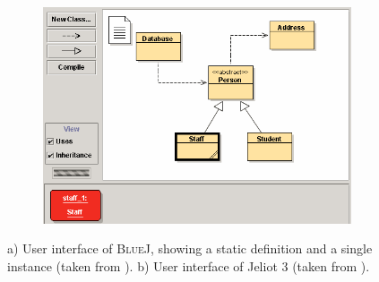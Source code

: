 \begin{figure}[b!]
	\centering
	
	\begin{subfigure}[b]{0.45\textwidth}
		\centering
        \includegraphics[width=\textwidth]{../images/06-Koelling-BlueJ}
        \caption[User Interface of \textsc{BlueJ}]{}
		\label{fig:BlueJ}
	\end{subfigure}
	\quad
	\begin{subfigure}[b]{0.45\textwidth}
		\centering
		\caption[User Interface of \textsc{Jeliot3}]{}
		\label{fig:Jeliot3}
	\end{subfigure}
	
	\caption[Object-Oriented Teaching Environments]{
		a) User interface of \textsc{BlueJ}, showing a static definition and a single instance (taken from \cite{kolling_bluej_2003}).
		b) User interface of Jeliot 3 (taken from \cite{moreno_visualizing_2004}).
	}
\end{figure}

